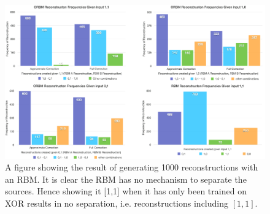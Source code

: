 \begin{landscape}
\begin{figure}
  \begin{center}
    \includegraphics[height=0.9\textheight]{Assets/results/xor-results}
  \end{center}
  \caption{A figure showing the result of generating 1000 reconstructions with an RBM. It is clear the RBM has no mechanism to separate the sources. Hence showing it [1,1] when it has only been trained on XOR results in no separation, i.e. reconstructions including $[1,1]$.}

  \label{F:Two-Bit-RBM-Inference-Results-1}
\end{figure}
\end{landscape}



